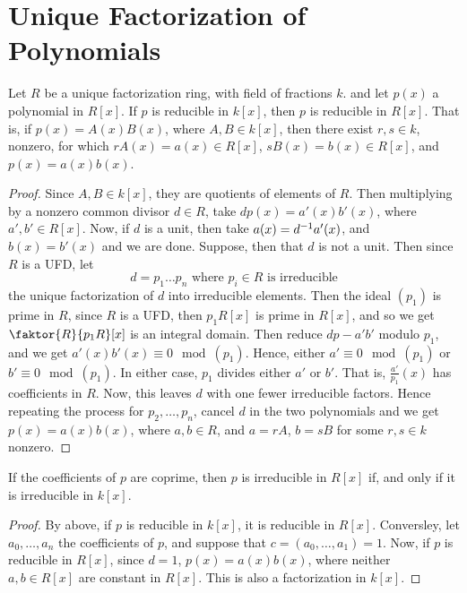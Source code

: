 \section{Unique Factorization of Polynomials}
\label{section_7.2}

\begin{lemma}[Gauss]\label{lemma_7.2.1}
  Let $R$ be a unique factorization ring, with field of fractions $k$. and let
  $p(x)$ a polynomial in $R[x]$. If $p$ is reducible in $k[x]$, then $p$ is
  reducible in  $R[x]$. That is, if $p(x)=A(x)B(x)$, where $A,B \in k[x]$,
  then there exist $r,s \in k$, nonzero, for which  $rA(x)=a(x) \in R[x]$,
  $sB(x)=b(x) \in R[x]$, and $p(x)=a(x)b(x)$.
\end{lemma}
\begin{proof}
  Since $A,B \in k[x]$, they are quotients of elements of $R$. Then
  multiplying by a nonzero common divisor  $d \in R$, take  $dp(x)=a'(x)b'(x)$,
  where $a',b' \in R[x]$. Now, if $d$ is a unit, then take
  $a(x)=d^{-1}a'(x)$, and $b(x)=b'(x)$ and we are done. Suppose, then that
  $d$ is not a unit. Then since  $R$ is a UFD, let
  \begin{equation*}
    d=p_1 \dots p_n \text{ where } p_i \in R \text{ is irreducible}
  \end{equation*}
  the unique factorization of $d$ into irreducible elements. Then the ideal
  $(p_1)$ is prime in $R$, since  $R$ is a UFD, then  $p_1R[x]$ is prime in
  $R[x]$, and so we get $\faktor{R}{p_1R}[x]$ is an integral domain. Then
  reduce $dp-a'b'$ modulo  $p_1$, and we get $a'(x)b'(x) \equiv 0
  \mod{(p_1)}$. Hence, either $a' \equiv 0 \mod{(p_1)}$ or $b' \equiv 0
  \mod{(p_1)}$. In either case, $p_1$ divides either $a'$ or  $b'$. That is,
  $\frac{a'}{p_1}(x)$ has coefficients in $R$. Now, this leaves  $d$ with one
  fewer irreducible factors. Hence repeating the process for  $p_2, \dots,
  p_n$, cancel $d$ in the two polynomials and we get  $p(x)=a(x)b(x)$, where
  $a,b \in R$, and  $a=rA$,  $b=sB$ for some  $r,s \in k$ nonzero.
\end{proof}
\begin{corollary}
  If the coefficients of $p$ are coprime, then  $p$ is irreducible in  $R[x]$
  if, and only if it is irreducible in $k[x]$.
\end{corollary}
\begin{proof}
  By above, if $p$ is reducible in $k[x]$, it is reducible in $R[x]$.
  Conversley, let $a_0, \dots, a_n$ the coefficients of $p$, and suppose that
  $c=(a_0, \dots, a_1)=1$. Now, if $p$ is reducible in $R[x]$, since $d=1$,
  $p(x)=a(x)b(x)$, where neither $a,b \in R[x]$ are constant in $R[x]$. This
  is also a factorization in $k[x]$.
\end{proof}

